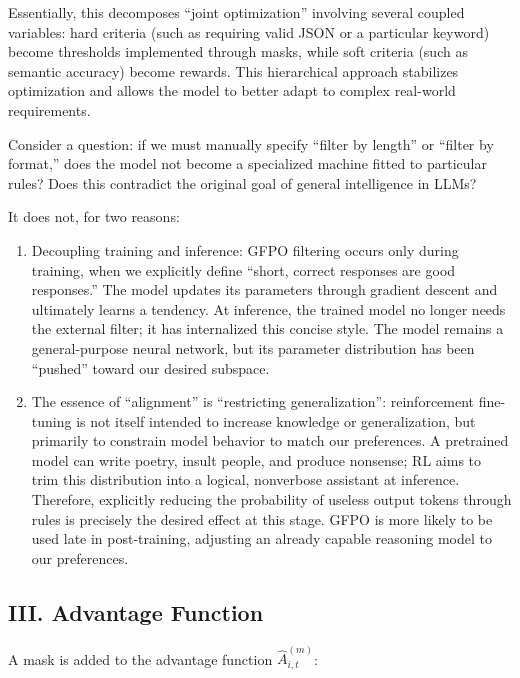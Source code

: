 Essentially, this decomposes ``joint optimization'' involving several coupled variables: hard criteria (such as requiring valid JSON or a particular keyword) become thresholds implemented through masks, while soft criteria (such as semantic accuracy) become rewards. This hierarchical approach stabilizes optimization and allows the model to better adapt to complex real-world requirements.

Consider a question: if we must manually specify ``filter by length'' or ``filter by format,'' does the model not become a specialized machine fitted to particular rules? Does this contradict the original goal of general intelligence in LLMs?

It does not, for two reasons:

\begin{enumerate}
\def\labelenumi{\arabic{enumi}.}
\item
  Decoupling training and inference: GFPO filtering occurs only during training, when we explicitly define ``short, correct responses are good responses.'' The model updates its parameters through gradient descent and ultimately learns a tendency. At inference, the trained model no longer needs the external filter; it has internalized this concise style. The model remains a general-purpose neural network, but its parameter distribution has been ``pushed'' toward our desired subspace.
\item
  The essence of ``alignment'' is ``restricting generalization'': reinforcement fine-tuning is not itself intended to increase knowledge or generalization, but primarily to constrain model behavior to match our preferences. A pretrained model can write poetry, insult people, and produce nonsense; RL aims to trim this distribution into a logical, nonverbose assistant at inference. Therefore, explicitly reducing the probability of useless output tokens through rules is precisely the desired effect at this stage. GFPO is more likely to be used late in post-training, adjusting an already capable reasoning model to our preferences.
\end{enumerate}

\hypertarget{iii.-advantage-function}{%
\subsection{III. Advantage Function}\label{iii.-advantage-function}}

A mask is added to the advantage function \(\hat{A}_{i,t}^{(m)}\):

